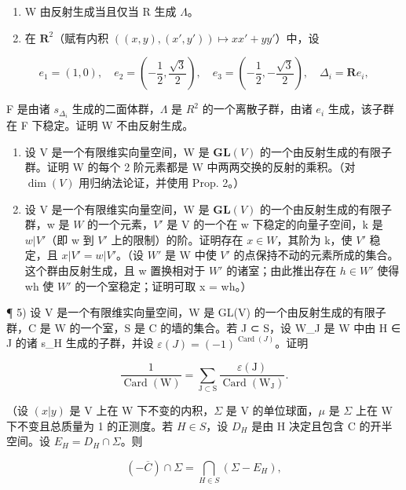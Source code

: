 \begin{enumerate}
\def\labelenumi{\alph{enumi})}
\item
  W 由反射生成当且仅当 R 生成 \(\Lambda\)。
\item
  在 \(\mathbf{R}^2\)（赋有内积 \(((x,y),(x',y'))\mapsto xx' + yy'\)）中，设
\end{enumerate}

\[
e _ {1} = (1, 0), \quad e _ {2} = \left(- \frac {1}{2}, \frac {\sqrt {3}}{2}\right), \quad e _ {3} = \left(- \frac {1}{2}, - \frac {\sqrt {3}}{2}\right), \quad \Delta_ {i} = \mathbf {R} e _ {i},
\]

F 是由诸 \(s_{\Delta_{i}}\) 生成的二面体群，\(\Lambda\) 是 \(R^{2}\) 的一个离散子群，由诸 \(e_{i}\) 生成，该子群在 F 下稳定。证明 W 不由反射生成。

\begin{enumerate}
\def\labelenumi{\arabic{enumi})}
\setcounter{enumi}{2}
\item
  设 V 是一个有限维实向量空间，W 是 \(\mathbf{GL}(V)\) 的一个由反射生成的有限子群。证明 W 的每个 2 阶元素都是 W 中两两交换的反射的乘积。（对 \(\dim(V)\) 用归纳法论证，并使用 Prop. 2。）
\item
  设 V 是一个有限维实向量空间，W 是 \(\mathbf{GL}(V)\) 的一个由反射生成的有限子群，w 是 \(W\) 的一个元素，\(V'\) 是 V 的一个在 w 下稳定的向量子空间，k 是 \(w|V'\)（即 w 到 \(V'\) 上的限制）的阶。证明存在 \(x \in W\)，其阶为 k，使 \(V'\) 稳定，且 \(x|V' = w|V'\)。（设 \(W'\) 是 W 中使 \(V'\) 的点保持不动的元素所成的集合。这个群由反射生成，且 w 置换相对于 \(W'\) 的诸室；由此推出存在 \(h \in W'\) 使得 wh 使 \(W'\) 的一个室稳定；证明可取 x = wh。）
\end{enumerate}

¶ 5) 设 V 是一个有限维实向量空间，W 是 GL(V) 的一个由反射生成的有限子群，C 是 W 的一个室，S 是 C 的墙的集合。若 J ⊂ S，设 W\_J 是 W 中由 H ∈ J 的诸 s\_H 生成的子群，并设 \(\varepsilon(J) = (-1)^{\operatorname{Card}(J)}\)。证明

\[
\frac {1}{\operatorname{Card} (\mathrm{W})} = \sum_ {\mathrm{J} \subset \mathrm{S}} \frac {\varepsilon (\mathrm{J})}{\operatorname{Card} (\mathrm{W} _ {\mathrm{J}})}.\tag{(*)}
\]

（设 \((x|y)\) 是 V 上在 W 下不变的内积，\(\Sigma\) 是 V 的单位球面，\(\mu\) 是 \(\Sigma\) 上在 W 下不变且总质量为 1 的正测度。若 \(H \in S\)，设 \(D_{H}\) 是由 H 决定且包含 C 的开半空间。设 \(E_{H} = D_{H} \cap \Sigma\)。则

\[
(- \overline {{C}}) \cap \Sigma = \bigcap_ {H \in S} (\Sigma - E _ {H}),
\]

